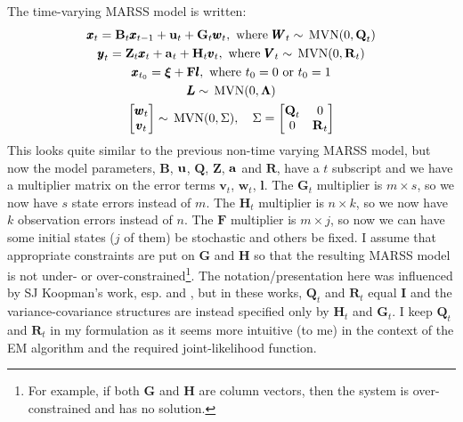 \documentclass[]{article}
\def\xixi{\mbox{\boldmath $\xi$}}
\def\LAM{\mbox{\boldmath $\Lambda$}}
\def\ZZ{\mbox{$\mathbf Z$}}	\def\zz{\mbox{$\mathbf z$}}
\def\BB{\mbox{$\mathbf B$}}	\def\bb{\mbox{$\mathbf b$}}
\def\FF{\mbox{$\mathbf F$}} \def\ff{\mbox{$\mathbf f$}}
\def\GG{\mbox{$\mathbf G$}}	\def\gg{\mbox{$\mathbf g$}}
\def\HH{\mbox{$\mathbf H$}}	\def\hh{\mbox{$\mathbf h$}}
\def\II{\mbox{$\mathbf I$}} \def\ii{\mbox{$\mathbf i$}}
\def\QQ{\mbox{$\mathbf Q$}}	 \def\qq{\mbox{$\mathbf q$}}
\def\RR{\mbox{$\mathbf R$}}	 \def\rr{\mbox{$\mathbf r$}}
\def\VV{\mbox{$\pmb{V}$}}	\def\vv{\mbox{$\pmb{v}$}}
\def\WW{\mbox{$\pmb{W}$}}	\def\ww{\mbox{$\pmb{w}$}}
\def\LL{\mbox{$\pmb{L}$}}	\def\ll{\mbox{$\pmb{l}$}}
\def\MVN{\,\textup{\textrm{MVN}}}
\begin{document}
The time-varying MARSS model is written:
\begin{subequations}\label{eq:MARSS.ex2}
\begin{gather}
\xx_t = \BB_t\xx_{t-1} + \uu_t + \GG_t\ww_t, \text{ where } \WW_t \sim \MVN(0,\QQ_t)\\
\yy_t = \ZZ_t\xx_t + \aa_t + \HH_t\vv_t, \text{ where } \VV_t \sim \MVN(0,\RR_t)\\
\xx_{t_0} = \xixi+\FF\ll, \text{ where } t_0=0 \text{ or } t_0=1\\
\LL \sim \MVN(0,\LAM)\\
\begin{bmatrix}\ww_t\\ \vv_t\end{bmatrix} \sim \MVN(0,\Sigma), \quad \Sigma=\begin{bmatrix}\QQ_t&0\\ 0&\RR_t\end{bmatrix}
\end{gather}
\end{subequations}
This looks quite similar to the previous non-time varying MARSS model, but now the model parameters, $\BB$, $\uu$, $\QQ$, $\ZZ$, $\aa$ and $\RR$, have a $t$ subscript and we have a multiplier matrix on the error terms $\vv_t$, $\ww_t$, $\ll$. The $\GG_t$ multiplier is $m \times s$, so we now have $s$ state errors instead of $m$.  The $\HH_t$ multiplier is $n \times k$, so we now have $k$ observation errors instead of $n$.  The $\FF$ multiplier is $m \times j$, so now we can have some initial states ($j$ of them) be stochastic and others be fixed.  I assume that appropriate constraints are put on $\GG$ and $\HH$ so that the resulting MARSS model is not under- or over-constrained\footnote{For example, if both $\GG$ and $\HH$ are column vectors, then the system is over-constrained and has no solution.}.
The notation/presentation here was influenced by SJ Koopman's work, esp. \citet{KoopmanOoms2011} and \citet{Koopman1993}, but in these works, $\QQ_t$ and $\RR_t$ equal $\II$ and the variance-covariance structures are instead specified only by $\HH_t$ and $\GG_t$.  I keep $\QQ_t$ and $\RR_t$ in my formulation as it seems more intuitive (to me) in the context of the EM algorithm and the required joint-likelihood function. 
\end{document}
